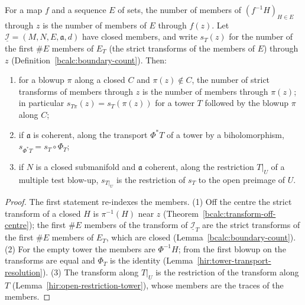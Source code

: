 \begin{lemma}
\label{bcalc:boundary-count-canonical}
\mixedleanok
For a map \(f\) and a sequence \(E\) of sets, the number of members of \((f^{-1}H)_{H\in E}\) through \(z\) is the number of members of \(E\) through \(f(z)\). Let
\(\underline{\mathcal I}=(M,N,E,\mathfrak a,d)\) have closed members, and write \(s_T(z)\) for the number of the first \(\#E\) members of \(E_T\) (the strict transforms of the
members of \(E\)) through \(z\) (Definition~\ref{bcalc:boundary-count}). Then:
\begin{enumerate}
\item for a blowup \(\pi\) along a closed \(C\) and \(\pi(z)\notin C\), the number of strict transforms of members through \(z\) is the number of members through \(\pi(z)\);
in particular \(s_{T\pi}(z)=s_T(\pi(z))\) for a tower \(T\) followed by the blowup \(\pi\) along \(C\);
\item if \(\mathfrak a\) is coherent, along the transport \(\Phi^*T\) of a tower by a biholomorphism, \(s_{\Phi^*T}=s_T\circ\Phi_T\);
\item if \(N\) is a closed submanifold and \(\mathfrak a\) coherent, along the restriction \(T|_U\) of a multiple test blow-up, \(s_{T|_U}\) is the restriction of \(s_T\) to the
open preimage of \(U\).
\end{enumerate}
\end{lemma}
\begin{proof}
\mixedleanok
The first statement re-indexes the members. (1) Off the centre the strict transform of a closed \(H\) is \(\pi^{-1}(H)\) near \(z\) (Theorem~\ref{bcalc:transform-off-centre}); the first
\(\#E\) members of the transform of \(\underline{\mathcal I}_T\) are the strict transforms of the first \(\#E\) members of \(E_T\), which are closed
(Lemma~\ref{bcalc:boundary-count}). (2) For the empty tower the members are \(\Phi^{-1}H\); from the first blowup on the transforms are equal and \(\Phi_T\) is the
identity (Lemma~\ref{hir:tower-transport-resolution}). (3) The transform along \(T|_U\) is the restriction of the transform along \(T\)
(Lemma~\ref{hir:open-restriction-tower}), whose members are the traces of the members.
\end{proof}

